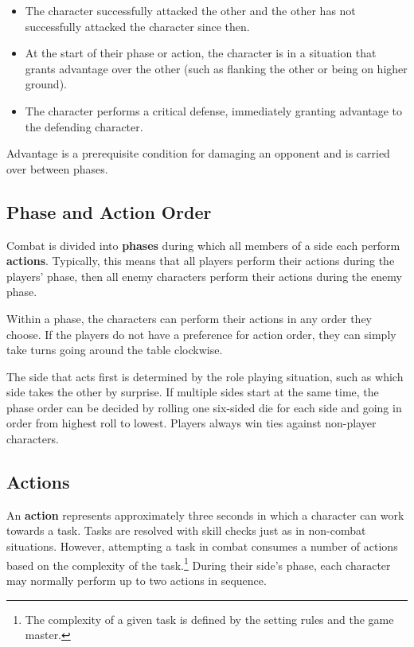\documentclass[11pt]{article}
\begin{document}
\begin{itemize}
	\item The character successfully attacked the other and the other has not successfully attacked the character since then.
	\item At the start of their phase or action, the character is in a situation that grants advantage over the other (such as flanking the other or being on higher ground).
	\item The character performs a critical defense, immediately granting advantage to the defending character.
\end{itemize}

Advantage is a prerequisite condition for damaging an opponent and is carried over between phases.

\subsection{Phase and Action Order}
Combat is divided into \textbf{phases} during which all members of a side each perform \textbf{actions}.
Typically, this means that all players perform their actions during the players' phase, then all enemy characters perform their actions during the enemy phase.

Within a phase, the characters can perform their actions in any order they choose.
If the players do not have a preference for action order, they can simply take turns going around the table clockwise.

The side that acts first is determined by the role playing situation, such as which side takes the other by surprise.
If multiple sides start at the same time, the phase order can be decided by rolling one six-sided die for each side and going in order from highest roll to lowest.
Players always win ties against non-player characters.

\subsection{Actions}
An \textbf{action} represents approximately three seconds in which a character can work towards a task. 
Tasks are resolved with skill checks just as in non-combat situations.
However, attempting a task in combat consumes a number of actions based on the complexity of the task.\footnote{The complexity of a given task is defined by the setting rules and the game master.}
During their side's phase, each character may normally perform up to two actions in sequence.
\end{document}
